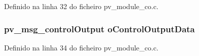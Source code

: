 Definido na linha 32 do ficheiro pv\-\_\-module\-\_\-co.\-c.

\hypertarget{group__Module__RC_ga0a14ca4568444d2d76c256fa91585cdf}{
\subsubsection[{o\-Control\-Output\-Data}]{\setlength{\rightskip}{0pt plus 5cm}pv\-\_\-msg\-\_\-control\-Output o\-Control\-Output\-Data}}\label{group__Module__RC_ga0a14ca4568444d2d76c256fa91585cdf}


Definido na linha 34 do ficheiro pv\-\_\-module\-\_\-co.\-c.

